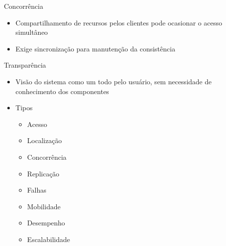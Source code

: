 \documentclass[aspectratio=169,
				xcolor=table]{beamer}
\begin{document}
	\begin{frame}{Concorrência}
		\begin{itemize}
			\item Compartilhamento de recursos pelos clientes pode ocasionar o acesso simultâneo
			\vspace{1em}
			\item Exige sincronização para manutenção da consistência
		\end{itemize}
	\end{frame}
	
	\begin{frame}{Transparência}
		\begin{itemize}
			\item Visão do sistema como um todo pelo usuário, sem necessidade de conhecimento dos componentes
			\vspace{0.8em}
			\item Tipos
			\begin{itemize}
				\item Acesso
				\item Localização
				\item Concorrência
				\item Replicação
				\item Falhas
				\item Mobilidade
				\item Desempenho
				\item Escalabilidade
			\end{itemize}
		\end{itemize}
	\end{frame}

	\begin{frame}{}
	\end{frame}
	
\end{document}
